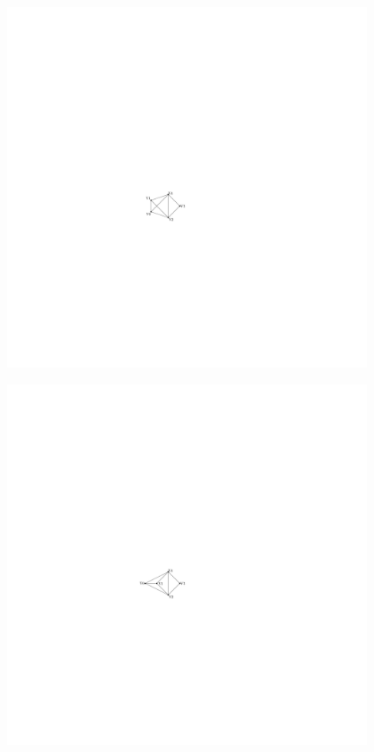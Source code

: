 \documentclass{beamer}
\begin{document}
\begin{frame}
\begin{columns}[c]
\begin{column}{5cm}
\begin{itemize}[<+->]
  \end{itemize}
\end{column}
\begin{column}{5cm}
        \begin{figure}[h]
                \centering
                \includegraphics[width=.7\textwidth]{exampleA/straightlineNonplanar}
                \label{fig:exampleAstraightlineNonplanar}
        \end{figure}
        \begin{figure}[h]
                \centering
                \includegraphics[width=.7\textwidth]{exampleA/straightline}
                \label{fig:exampleAstraightline}
        \end{figure}
\end{column}
\end{columns}
\end{frame}
\end{document}
